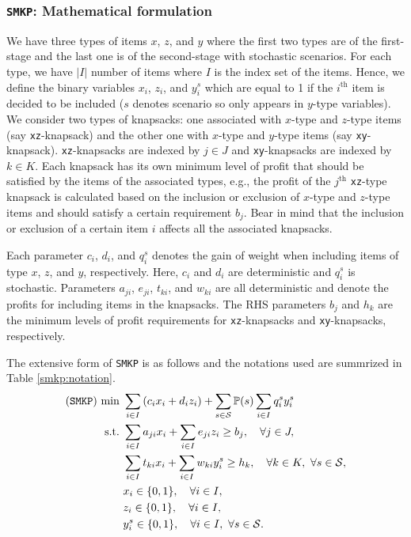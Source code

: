 \subsubsection{\texttt{SMKP}: Mathematical formulation}
We have three types of items $x$, $z$, and $y$ where the first two types are of the first-stage and the last one is of the second-stage with stochastic scenarios. For each type, we have $|I|$ number of items where $I$ is the index set of the items. Hence, we define the binary variables $x_i$, $z_i$, and $y_i^s$ which are equal to 1 if the $i^{\mathrm{th}}$ item is decided to be included ($s$ denotes scenario so only appears in $y$-type variables). We consider two types of knapsacks: one associated with $x$-type and $z$-type items (say \texttt{xz}-knapsack) and the other one with $x$-type and $y$-type items (say \texttt{xy}-knapsack). \texttt{xz}-knapsacks are indexed by $j\in J$ and \texttt{xy}-knapsacks are indexed by $k\in K$.  Each knapsack has its own minimum level of profit that should be satisfied by the items of the associated types, e.g., the profit of the $j^{\mathrm{th}}$ \texttt{xz}-type knapsack is calculated based on the inclusion or exclusion of $x$-type and $z$-type items and should satisfy a certain requirement $b_j$. Bear in mind that the inclusion or exclusion of a certain item $i$ affects all the associated knapsacks.
 
Each parameter $c_i$, $d_i$, and $q_i^s$ denotes the gain of weight when including items of type $x$, $z$, and $y$, respectively. Here, $c_i$ and $d_i$ are deterministic and $q_i^s$ is stochastic. Parameters $a_{ji}$, $e_{ji}$, $t_{ki}$, and $w_{ki}$ are all deterministic and denote the profits for including items in the knapsacks. The RHS parameters $b_j$ and $h_k$ are the minimum levels of profit requirements for \texttt{xz}-knapsacks and \texttt{xy}-knapsacks, respectively.

The extensive form of \texttt{SMKP} is as follows and the notations used are summrized in Table \ref{smkp:notation}.
\begin{subequations}
	\begin{align}
	(\texttt{SMKP})\ \textrm{min}\ &\sum_{i \in I}\left(c_i x_i + d_i z_i\right) + \sum_{s\in\mathcal{S}}\operatorname*{\mathbb{P}}(s)\sum_{i\in I}q_i^s y_i^s \label{smkp:obj}\\
	\textrm{s.t.}\ &  \sum_{i\in I}a_{ji}x_{i} + \sum_{i \in I}e_{ji}z_i\ge b_j,\quad\forall j\in J, \label{smkp:b}\\
	&  \sum_{i\in I} t_{ki}x_i + \sum_{i\in I}w_{ki} y_i^s\ge h_k,\quad\forall k\in K,\ \forall s\in\mathcal{S}, \label{smkp:c}\\
	&  x_i\in\{0,1\},\quad\forall i\in I, \label{smkp:d}\\
	&  z_i\in\{0,1\},\quad\forall i\in I, \label{smkp:e}\\
	&  y_i^s\in\{0,1\},\quad\forall i\in I,\ \forall s\in \mathcal{S}. \label{smkp:f}
	\end{align}
\end{subequations}

